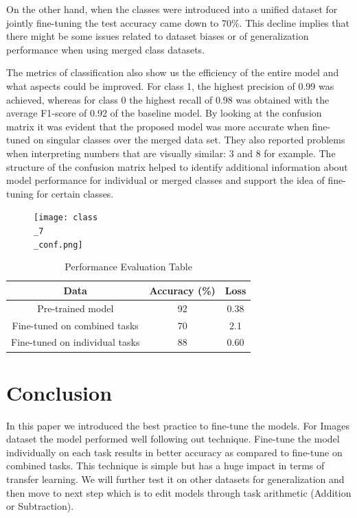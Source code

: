 \documentclass[conference]{IEEEtran}
\begin{document}

On the other hand, when the classes were introduced into a unified dataset for jointly fine-tuning the test accuracy came down to 70\%. This decline implies that there might be some issues related to dataset biases or of generalization performance when using merged class datasets.

The metrics of classification also show us the efficiency of the entire model and what aspects could be improved. For class 1, the highest precision of 0.99 was achieved, whereas for class 0 the highest recall of 0.98 was obtained with the average F1-score of 0.92 of the baseline model. By looking at the confusion matrix it was evident that the proposed model was more accurate when fine-tuned on singular classes over the merged data set. They also reported problems when interpreting numbers that are visually similar: 3 and 8 for example. The structure of the confusion matrix helped to identify additional information about model performance for individual or merged classes and support the idea of fine-tuning for certain classes.


\begin{figure}[h]
    \centering
    \texttt{[image: class\\\_7\\\_conf.png]}
    
\end{figure}

\begin{table}[htbp]
\caption{Performance Evaluation Table}
\begin{center}
\begin{tabular}{|c|c|c|}
\hline
\textbf{Data} & \textbf{Accuracy (\%)} & \textbf{Loss} \\ 
\hline
Pre-trained model & 92 & 0.38 \\ 
\hline
Fine-tuned on combined tasks & 70 & 2.1 \\ 
\hline
Fine-tuned on individual tasks & 88 & 0.60 \\ 
\hline
\end{tabular}
\label{tab:performance}
\end{center}
\end{table}



\section{Conclusion}
In this paper we introduced the best practice to fine-tune the models. For Images dataset the model performed well following out technique. Fine-tune the model individually on each task results in better accuracy as compared to fine-tune on combined tasks. This technique is simple but has a huge impact in terms of transfer learning. We will further test it on other datasets for generalization and then move to next step which is to edit models through task arithmetic (Addition or Subtraction).
\end{document}
